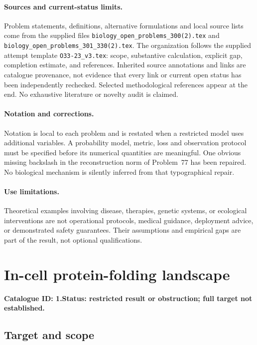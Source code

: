 \documentclass[11pt]{article}
\begin{document}
\paragraph{Sources and current-status limits.}
Problem statements, definitions, alternative formulations and local source lists
come from the supplied files
\texttt{biology\_open\_problems\_300(2).tex} and
\texttt{biology\_open\_problems\_301\_330(2).tex}.
The organization follows the supplied attempt template
\texttt{O33-23\_v3.tex}: scope, substantive calculation, explicit gap,
completion estimate, and references. Inherited source annotations and links are
catalogue provenance, not evidence that every link or current open status has
been independently rechecked. Selected methodological references appear at the
end. No exhaustive literature or novelty audit is claimed.

\paragraph{Notation and corrections.}
Notation is local to each problem and is restated when a restricted model uses
additional variables. A probability model, metric, loss and observation protocol
must be specified before its numerical quantities are meaningful. One obvious
missing backslash in the reconstruction norm of Problem~77 has been repaired.
No biological mechanism is silently inferred from that typographical repair.

\paragraph{Use limitations.}
Theoretical examples involving disease, therapies, genetic systems, or ecological
interventions are not operational protocols, medical guidance, deployment advice,
or demonstrated safety guarantees. Their assumptions and empirical gaps are part
of the result, not optional qualifications.

\setcounter{section}{0}
\section{In-cell protein-folding landscape}
\label{prob:001}
\noindent\textbf{Catalogue ID: 1.}\quad \textbf{Status: restricted result or obstruction; full target not established.}
\subsection{Target and scope}
\end{document}
